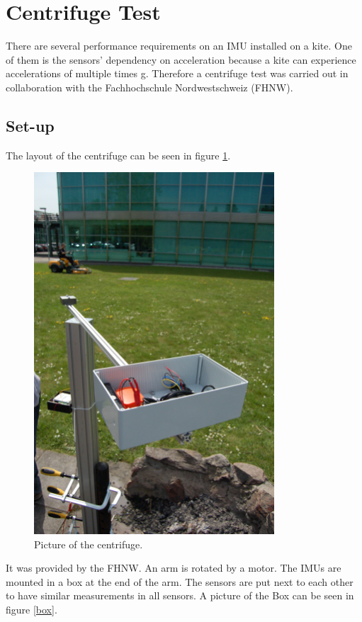 \section{Centrifuge Test}
There are several performance requirements on an IMU installed on a kite. One of them is the sensors' dependency on acceleration because a kite can experience accelerations of multiple times g. Therefore a centrifuge test was carried out in collaboration with the Fachhochschule Nordwestschweiz (FHNW).
\subsection{Set-up}
The layout of the centrifuge can be seen in figure \ref{centrifuge}.
\begin{figure}[hb]
\begin{center}
\includegraphics[width=0.8\textwidth]{pictures/centrifuge.JPG}
\caption{Picture of the centrifuge.}
\label{centrifuge}
\end{center}
\end{figure}
It was provided by the FHNW. An arm is rotated by a motor. The IMUs are mounted in a box at the end of the arm. The sensors are put next to each other to have similar measurements in all sensors. A picture of the Box can be seen in figure \ref{box}. 
